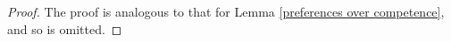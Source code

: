 \documentclass[11pt,]{article}
\begin{document}
\begin{proof}The proof is analogous to that for Lemma \ref{preferences over competence}, and so is omitted.



\end{proof}
\end{document}
